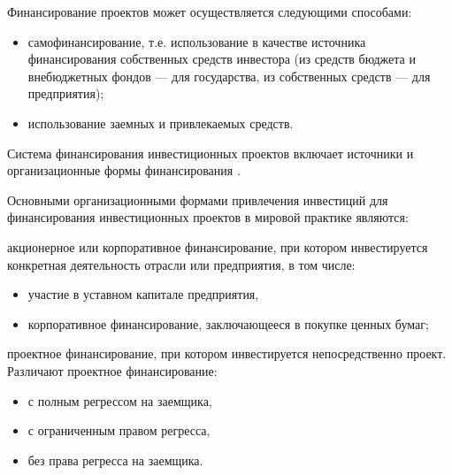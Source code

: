 Финансирование проектов может осуществляется следующими способами:
\begin{itemize}
	\item самофинансирование, т.е. использование в качестве источника финансирования собственных средств инвестора (из средств бюджета и внебюджетных фондов --- для государства, из собственных средств --- для предприятия);
	\item использование заемных и привлекаемых средств.
\end{itemize}

Система финансирования инвестиционных проектов включает источники и организационные формы финансирования \cite[268--269]{mazur}.

Основными организационными формами привлечения инвестиций для финансирования инвестиционных проектов в мировой практике являются:
\item акционерное или корпоративное финансирование, при котором инвестируется конкретная деятельность отрасли или предприятия, в том числе:
	\begin{itemize}
		\item участие в уставном капитале предприятия,
		\item корпоративное финансирование, заключающееся в покупке ценных бумаг;
	\end{itemize}
\item проектное финансирование, при котором инвестируется непосредственно проект. Различают проектное финансирование:
	\begin{itemize}
		\item с полным регрессом на заемщика,
		\item с ограниченным правом регресса,
		\item без права регресса на заемщика.
	\end{itemize}





